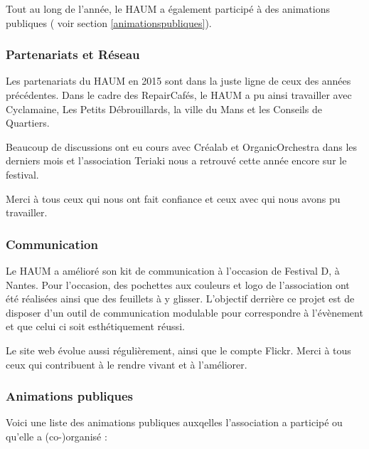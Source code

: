 \documentclass[11pt]{article}
\begin{document}
Tout au long de l'année, le HAUM a également participé à des animations publiques ( voir section \ref{animationspubliques}).


\subsubsection{Partenariats et Réseau}

Les partenariats du HAUM en 2015 sont dans la juste ligne de ceux des années précédentes. Dans le cadre des
RepairCafés, le HAUM a pu ainsi travailler avec Cyclamaine, Les Petits Débrouillards, la ville du Mans et les Conseils de Quartiers.

Beaucoup de discussions ont eu cours avec Créalab et OrganicOrchestra dans les derniers mois et l'association Teriaki
nous a retrouvé cette année encore sur le festival.

Merci à tous ceux qui nous ont fait confiance et ceux avec qui nous avons pu travailler.

\subsubsection{Communication}

Le HAUM a amélioré son kit de communication à l'occasion de Festival D, à Nantes. Pour l'occasion, des pochettes aux
couleurs et logo de l'association ont été réalisées ainsi que des feuillets à y glisser. L'objectif derrière ce projet
est de disposer d'un outil de communication modulable pour correspondre à l'évènement et que celui ci soit esthétiquement réussi.

Le site web évolue aussi régulièrement, ainsi que le compte Flickr. Merci à tous ceux qui contribuent à le rendre vivant et à l'améliorer.

\subsubsection{Animations publiques \label{animationspubliques}}

Voici une liste des animations publiques auxqelles l'association a participé ou qu'elle a (co-)organisé :
\end{document}
